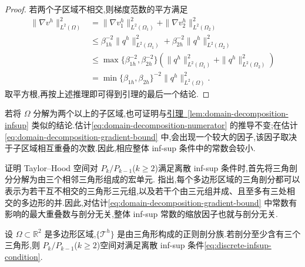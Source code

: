 \begin{proof}
若两个子区域不相交,则梯度范数的平方满足
\[
\begin{aligned}
  \|\nabla v^h\|_{L^2(\Omega)}^2
  &=\|\nabla v_1^h\|_{L^2(\Omega_1)}^2
    +\|\nabla v_2^h\|_{L^2(\Omega_2)}^2\\
  &\le \beta_{1h}^{-2}\|q^h\|_{L^2(\Omega_1)}^2
       +\beta_{2h}^{-2}\|q^h\|_{L^2(\Omega_2)}^2\\
  &\le \max\{\beta_{1h}^{-2},\beta_{2h}^{-2}\}
       \left(\|q^h\|_{L^2(\Omega_1)}^2
             +\|q^h\|_{L^2(\Omega_2)}^2\right)\\
  &= \min\{\beta_{1h},\beta_{2h}\}^{-2}
       \|q^h\|_{L^2(\Omega)}^2.
\end{aligned}
\]
取平方根,再按上述推理即可得到引理的最后一个结论.
\end{proof}

\begin{note}[子区域多于两个时]\label{note:domain-decomposition-many-subdomains}
若将 $\Omega$ 分解为两个以上的子区域,也可证明与\hyperref[lem:domain-decomposition-infsup]{引理~\ref{lem:domain-decomposition-infsup}} 类似的结论.估计\cref{eq:domain-decomposition-numerator} 的推导不变;在估计\cref{eq:domain-decomposition-gradient-bound} 中,会出现一个较大的因子,该因子取决于子区域相互重叠的次数.因此,相应整体 inf-sup 条件中的常数会较小.

证明 Taylor--Hood 空间对 $P_k/P_{k-1}$($k\ge2$)满足离散 inf-sup 条件时,首先将三角剖分分解为由三个相邻三角形组成的宏单元.\textcite[第 499 页]{Boffi2013} 指出,每个多边形区域的三角剖分都可以表示为若干互不相交的三角形三元组,以及若干个由三元组并成、且至多有三处相交的多边形的并.因此,对估计\cref{eq:domain-decomposition-gradient-bound} 中常数有影响的最大重叠数与剖分无关,整体 inf-sup 常数的缩放因子也就与剖分无关.
\end{note}

\begin{theorem}\label{thm:taylor-hood-2d-sufficient}
设 $\Omega\subset\mathbb{R}^2$ 是多边形区域,$\{\mathcal{T}^h\}$ 是由三角形构成的正则剖分族.若剖分至少含有三个三角形,则 $P_k/P_{k-1}$($k\ge2$)空间对满足离散 inf-sup 条件\cref{eq:discrete-infsup-condition}.
\end{theorem}

